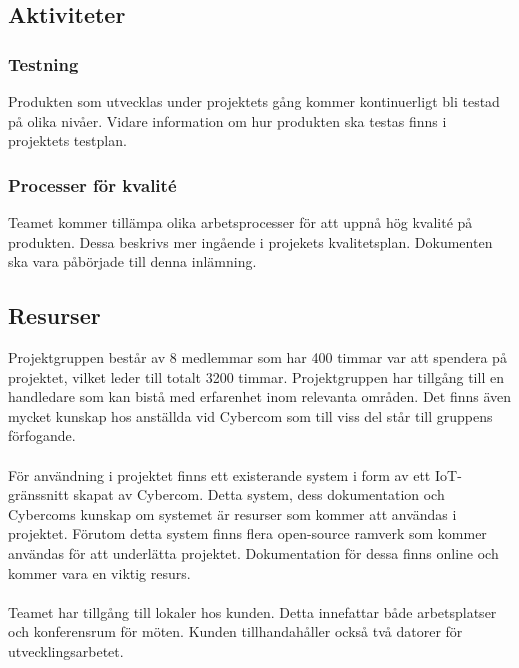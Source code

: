 \subsection{Aktiviteter}

\subsubsection*{Testning}
Produkten som utvecklas under projektets gång kommer kontinuerligt bli testad på olika nivåer. Vidare information om hur produkten ska testas finns i projektets testplan\cite{bib-testplan}.

\subsubsection*{Processer för kvalité}
Teamet kommer tillämpa olika arbetsprocesser för att uppnå hög kvalité på produkten. Dessa beskrivs mer ingående i projekets kvalitetsplan\cite{bib-kvalitetsplan}.
Dokumenten ska vara påbörjade till denna inlämning.

\subsection{Resurser}
Projektgruppen består av 8 medlemmar som har 400 timmar var att spendera på projektet, vilket leder till totalt 3200 timmar. Projektgruppen har tillgång till en handledare som kan bistå med erfarenhet inom relevanta områden. Det finns även mycket kunskap hos anställda vid Cybercom som till viss del står till gruppens förfogande.\\
\\
För användning i projektet finns ett existerande system i form av ett IoT-gränssnitt skapat av Cybercom. Detta system,
dess dokumentation och Cybercoms kunskap om systemet är resurser som kommer att användas i projektet. Förutom detta
system finns flera open-source ramverk som kommer användas för att underlätta projektet. Dokumentation för dessa finns online och kommer vara en viktig resurs.\\
\\
Teamet har tillgång till lokaler hos kunden. Detta innefattar både arbetsplatser och konferensrum för möten. Kunden tillhandahåller också två datorer för utvecklingsarbetet. \\

\pagebreak
